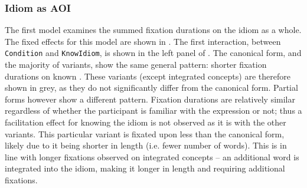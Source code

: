 \documentclass[output=paper
,modfonts
,nonflat]{langsci/langscibook}
\begin{document}
\subsubsection{Idiom as AOI}

The first model examines the summed fixation durations on the idiom as a whole. The fixed effects for this model are shown in . The first interaction, between \texttt{Condition} and \texttt{KnowIdiom}, is shown in the left panel of . The canonical form, and the majority of variants, show the same general pattern: shorter fixation durations on known . These variants (except integrated  concepts) are therefore shown in grey, as they do not significantly differ from the canonical form. Partial forms  however show a different pattern. Fixation durations are relatively similar regardless of whether the participant is familiar with the expression or not; thus a facilitation effect for knowing the idiom is not observed as it is with the other variants. This particular variant is fixated upon less than the canonical form, likely due to it being shorter in length (i.e. fewer number of words). This is in line with longer fixations observed on integrated concepts -- an additional word is integrated into the idiom, making it longer in length and requiring additional fixations. 
\end{document}
